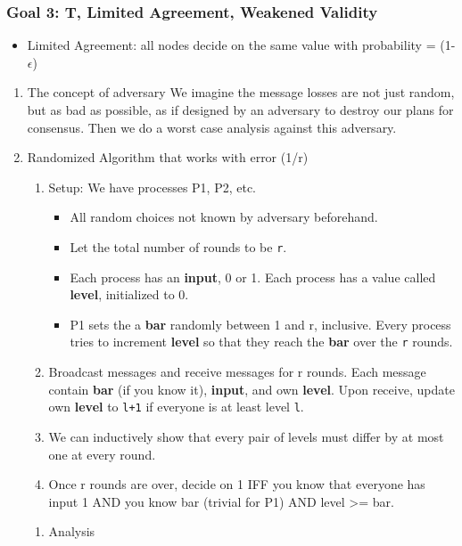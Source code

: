 \documentclass[11pt]{article}
\begin{document}
\subsubsection{Goal 3: T, Limited Agreement, Weakened Validity}
\label{sec:org03a1962}
\begin{itemize}
\item Limited Agreement: all nodes decide on the same value with probability =
(1-\(\epsilon\))
\end{itemize}
\begin{enumerate}
\item The concept of adversary
\label{sec:org9f15920}
We imagine the message losses are not just random, but as bad as possible, as if
designed by an adversary to destroy our plans for consensus. Then we do a worst
case analysis against this adversary.
\item Randomized Algorithm that works with error (1/r)
\label{sec:org26110d8}
\begin{enumerate}
\item Setup: We have processes P1, P2, etc.
\begin{itemize}
\item All random choices not known by adversary beforehand.
\item Let the total number of rounds to be \texttt{r}.
\item Each process has an \textbf{input}, 0 or 1. Each process has a value called
\textbf{level}, initialized to 0.
\item P1 sets the a \textbf{bar} randomly between 1 and r, inclusive. Every process
tries to increment \textbf{level} so that they reach the \textbf{bar} over the \texttt{r}
rounds.
\end{itemize}
\item Broadcast messages and receive messages for r rounds. Each message contain
\textbf{bar} (if you know it), \textbf{input}, and own \textbf{level}. Upon receive, update own
\textbf{level} to \texttt{l+1} if everyone is at least level \texttt{l}.
\item We can inductively show that every pair of levels must differ by at most one
at every round.
\item Once r rounds are over, decide on 1 IFF you know that everyone has input 1
AND you know bar (trivial for P1) AND level >= bar.
\end{enumerate}
\begin{enumerate}
\item Analysis
\label{sec:org8d112e9}
\begin{enumerate}

\end{enumerate}
\end{enumerate}
\end{enumerate}
\end{document}
